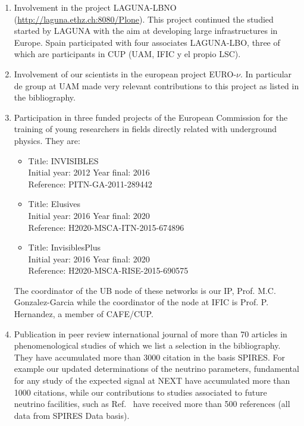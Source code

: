 \documentclass[a4paper,11pt,oneside]{article}
\begin{document}
\begin{enumerate}
\item Involvement in the project LAGUNA-LBNO
(\url{http://laguna.ethz.ch:8080/Plone}). This project continued the
studied started by LAGUNA with the aim at developing large infrastructures
in Europe. Spain participated with four associates LAGUNA-LBO, three of
which are participants in CUP (UAM, IFIC y el propio LSC).
\item Involvement of our scientists in the european project EURO-$\nu$.
In particular de group at UAM made very relevant contributions to
this project as listed in the bibliography.
\item Participation in three funded projects of the European Commission
for the training of young researchers in fields directly related
with underground physics. They are: 
\begin{itemize}
\item 
Title: INVISIBLES\\
Initial year: 2012 Year final: 2016\\
Reference: PITN-GA-2011-289442\\
\item 
Title: 	Elusives\\
Initial year: 2016 Year final: 2020\\
Reference: H2020-MSCA-ITN-2015-674896 \\
\item  Title: 	InvisiblesPlus\\
Initial year: 2016 Year final: 2020\\
Reference: H2020-MSCA-RISE-2015-690575\\
\end{itemize}
The coordinator of the UB node of these networks is our IP, Prof.
M.C. Gonzalez-Garcia while the coordinator of the node at IFIC
is Prof. P. Hernandez, a member of CAFE/CUP.
\item Publication in peer review international journal 
of more than 70 articles in phenomenological studies of which 
we list a selection in the
bibliography. They have accumulated more than 3000 citation  in the
basis SPIRES. For example our updated determinations of the neutrino 
parameters, fundamental for any study of the expected signal at NEXT
\cite{Gonzalez-Garcia:2014bfa,GonzalezGarcia:2012sz,GonzalezGarcia:2010er} 
have accumulated more than 1000 citations,  
while our contributions to studies associated to future neutrino facilities,
such as Ref.~\cite{Bandyopadhyay:2007kx,Abazajian:2012ys,Choubey:2011zzq,Adey:2014rfv} have received more than 500 references (all data from SPIRES
Data basis).
\end{enumerate}
\end{document}
